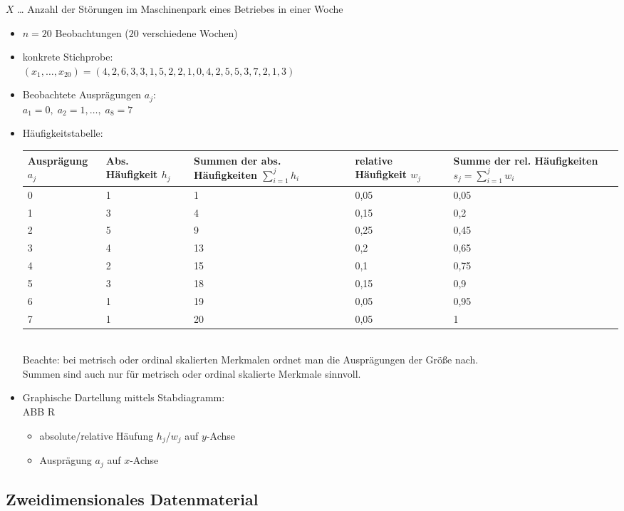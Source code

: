  $X$ … Anzahl der Störungen im Maschinenpark eines Betriebes in einer Woche
\begin{itemize}
\item $n=20$ Beobachtungen ($20$ verschiedene Wochen)
\item konkrete Stichprobe:\\
$(x_1, \ldots , x_{20}) = (4,2,6,3,3,1,5,2,2,1,0,4,2,5,5,3,7,2,1,3)$
\item Beobachtete Ausprägungen $a_j$:\\
$a_1=0, \; a_2 = 1, \ldots, \; a_8=7$
\item Häufigkeitstabelle:\\
\begin{tabular}{L{0.15} | L{0.15} | L{0.2} | L{0.15} | L{0.2}}
Ausprägung $a_j$ & Abs. Häufigkeit $h_j$ & Summen der abs. Häufigkeiten $\sum_{i=1}^j h_i$ & relative Häufigkeit $w_j$ & Summe der rel. Häufigkeiten $s_j = \sum_{i=1}^j w_i$\\ & 1 & 1 & 0,05 & 0,05\\
1 & 3 & 4 & 0,15 & 0,2\\
2 & 5 & 9 & 0,25 & 0,45\\
3 & 4 & 13 & 0,2 & 0,65\\
4 & 2 & 15 & 0,1 & 0,75\\
5 & 3 & 18 & 0,15 & 0,9\\
6 & 1 & 19 & 0,05 & 0,95\\
7 & 1 & 20 & 0,05 & 1
\end{tabular}\\
Beachte: bei metrisch oder ordinal skalierten Merkmalen ordnet man die Ausprägungen der Größe nach.\\
Summen sind auch nur für metrisch oder ordinal skalierte Merkmale sinnvoll.
\item Graphische Dartellung mittels Stabdiagramm:\\
ABB R
\begin{itemize}
\item absolute/relative Häufung $h_j$/$w_j$ auf $y$-Achse
\item Ausprägung $a_j$ auf $x$-Achse
\end{itemize}
\end{itemize}

\subsection{Zweidimensionales Datenmaterial}

